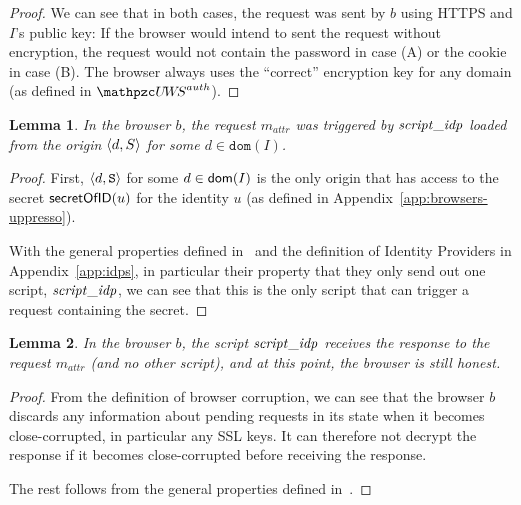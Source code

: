 \documentclass[letterpaper,onecolumn,10pt]{article}
\newtheorem{lemma}{Lemma}
\begin{document}
\begin{proof}
  We can see that in both cases, the request was sent by $b$ using
  HTTPS and $I$'s public key: If the browser would intend to sent the
  request without encryption, the request would not contain the
  password in case (A) or the cookie in case (B). The browser always
  uses the ``correct'' encryption key for any domain (as defined in
  $\uppressoauthwebsystem$).
\end{proof}

\begin{lemma} %
  In the browser $b$, the request $m_{attr}$ was triggered by $\mathit{script\_idp}$ 
  loaded from the origin $\langle {{}d, S} \rangle$ for some $d \in \mathtt{dom}(I)$.
\end{lemma}
\begin{proof}
  First, $\langle d,\mathtt{S}\rangle$ for some $d \in \mathsf{dom}(I)$ is the only
  origin that has access to the secret $\mathsf{secretOfID}(u)$ for the
  identity $u$ (as defined in Appendix~\ref{app:browsers-uppresso}).

  With the general properties defined in~\cite{fett2015analyzing} and the
  definition of Identity Providers in Appendix~\ref{app:idps}, in
  particular their property that they only send out one script,
  $\mathit{script\_idp}$, we can see that this is the only script that can
  trigger a request containing the secret.
\end{proof}

\begin{lemma} \label{lemma:idp-to-script-idp} %
  In the browser $b$, the script $\mathit{script\_idp}$ receives the response to the 
  request $m_{attr}$ (and no other script), and at this point, the browser is still 
  honest.
\end{lemma}
\begin{proof}
  From the definition of browser corruption, we can see that the
  browser $b$ discards any information about pending requests in its
  state when it becomes close-corrupted, in particular any SSL keys.
  It can therefore not decrypt the response if it becomes
  close-corrupted before receiving the response.

  The rest follows from the general properties defined
  in~\cite{fett2015analyzing}.
\end{proof}
\end{document}
